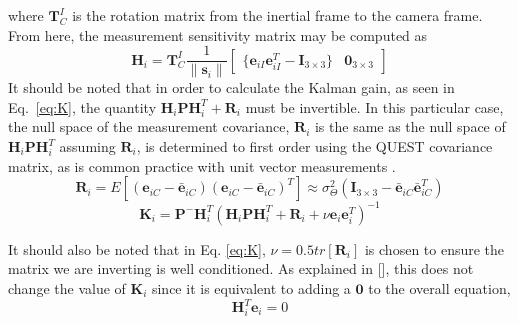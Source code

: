 \documentclass[]{aiaa-tc}%
\begin{document}
%
where $\textbf{T}_C^I$ is the rotation matrix from the inertial frame to the camera frame.  From here, the measurement sensitivity matrix may be computed as
%
\begin{equation}
\label{eq:H}
\textbf{H}_{i}=\textbf{T}_{C}^I\frac{1}{\|\textbf{s}_i\|}
\left[\begin{matrix}
\{\textbf{e}_{iI}\textbf{e}_{iI}^T-\textbf{I}_{3\times3}\} & \textbf{0}_{3\times3}
\end{matrix}\right]
\end{equation}
%
It should be noted that in order to calculate the Kalman gain, as seen in Eq.~\ref{eq:K}, the quantity $\textbf{H}_i\textbf{P}\textbf{H}_i^T+\textbf{R}_i$ must be invertible.  In this particular case, the null space of the measurement covariance, $\textbf{R}_{i}$ is the same as the null space of $\textbf{H}_i\textbf{P}\textbf{H}_i^T$ assuming $\textbf{R}_i$, is determined to first order using the QUEST covariance matrix, as is common practice with unit vector measurements \cite{Shuster:1981}.
%
\begin{equation}\label{eq:meascovR}
\textbf{R}_{i}=E[(\textbf{e}_{iC}-\bar{\textbf{e}}_{iC})(\textbf{e}_{iC}-\bar{\textbf{e}}_{iC})^T]\approx\sigma_\Theta^2(\textbf{I}_{3\times3}-\bar{\textbf{e}}_{iC}\bar{\textbf{e}}_{iC}^T)
\end{equation}
%
\begin{equation} \label{eq:Knew}
\textbf{K}_i=\textbf{P}^-\textbf{H}_i^T(\textbf{H}_i\textbf{P}\textbf{H}_i^T+\textbf{R}_i+\nu\textbf{e}_i\textbf{e}_i^T)^{-1}
\end{equation}

%
It should also be noted that in Eq. \ref{eq:K}, $\nu=0.5tr[\textbf{R}_i]$ is chosen to ensure the matrix we are inverting is well conditioned. As explained in [], this does not change the value of $\textbf{K}_i$ since it is equivalent to adding a $\textbf{0}$ to the overall equation,
%
\begin{equation} \label{eq:Htranse}
\textbf{H}_i^T\textbf{e}_i=0
\end{equation}
%

\end{document}
